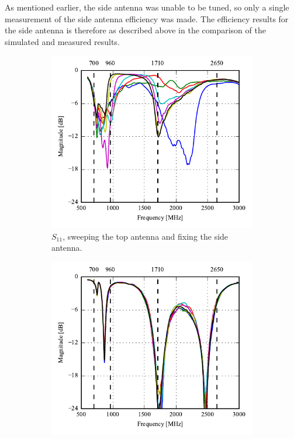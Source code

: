 As mentioned earlier, the side antenna was unable to be tuned, so only a single measurement of the side antenna efficiency was made. The efficiency results for the side antenna is therefore as described above in the comparison of the simulated and measured results.

\begin{figure}[htbp]
    \centering
    \begin{subfigure}{0.49\linewidth}
        \centering
        \includegraphics{img/tech_sol/nonresonant/prototype/s11_csh1.pdf}
        \caption{$S_{11}$, sweeping the top antenna and fixing the side antenna.}
    \end{subfigure}
    \hfill
    \begin{subfigure}{0.49\linewidth}
        \centering
        \includegraphics{img/tech_sol/nonresonant/prototype/s22_csh1.pdf}

\end{subfigure}
\end{figure}
